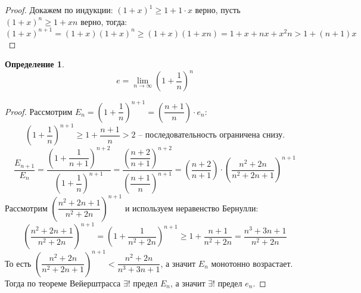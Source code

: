 \documentclass[12pt]{article}
\theoremstyle{definition}
\newtheorem{definition}{Определение}
\begin{document}
\begin{proof}
    Докажем по индукции: $(1+x)^1\geq 1+1\cdot x$ верно, пусть $(1+x)^n\geq 1+xn$ верно, тогда:
    $$(1+x)^{n+1}=(1+x)(1+x)^n\geq (1+x)(1+xn)=1+x+nx+x^2n>1+(n+1)x$$
\end{proof}
\begin{definition}
    $$e=\lim_{n\to \infty}\left(1+\dfrac{1}{n}\right)^n$$
\end{definition}
\begin{proof}
    Рассмотрим $E_n=\left(1+\dfrac{1}{n}\right)^{n+1}=\left(\dfrac{n+1}{n}\right)\cdot e_n$:
    $$\left(1+\dfrac{1}{n}\right)^{n+1}\geq 1+\dfrac{n+1}{n}>2\text{ -- последовательность ограничена снизу.}$$
    $$\dfrac{E_{n+1}}{E_n}=\dfrac{\left(1+\dfrac{1}{n+1}\right)^{n+2}}{\left(1+\dfrac{1}{n}\right)^{n+1}}=\dfrac{\left(\dfrac{n+2}{n+1}\right)^{n+2}}{\left(\dfrac{n+1}{n}\right)^{n+1}}=\left(\dfrac{n+2}{n+1}\right)\cdot\left(\dfrac{n^2+2n}{n^2+2n+1}\right)^{n+1}$$
    Рассмотрим $\left(\dfrac{n^2+2n+1}{n^2+2n}\right)^{n+1}$ и используем неравенство Бернулли:
    $$\left(\dfrac{n^2+2n+1}{n^2+2n}\right)^{n+1}=\left(1+\dfrac{1}{n^2+2n}\right)^{n+1}\geq1+\dfrac{n+1}{n^2+2n}=\dfrac{n^3+3n+1}{n^2+2n}$$
    То есть $\left(\dfrac{n^2+2n}{n^2+2n+1}\right)^{n+1}<\dfrac{n^2+2n}{n^3+3n+1}$, а значит $E_n$ монотонно возрастает. Тогда по теореме Вейерштрасса $\exists!$ предел $E_n$, а значит $\exists!$ предел $e_n$.
\end{proof}
\end{document}

